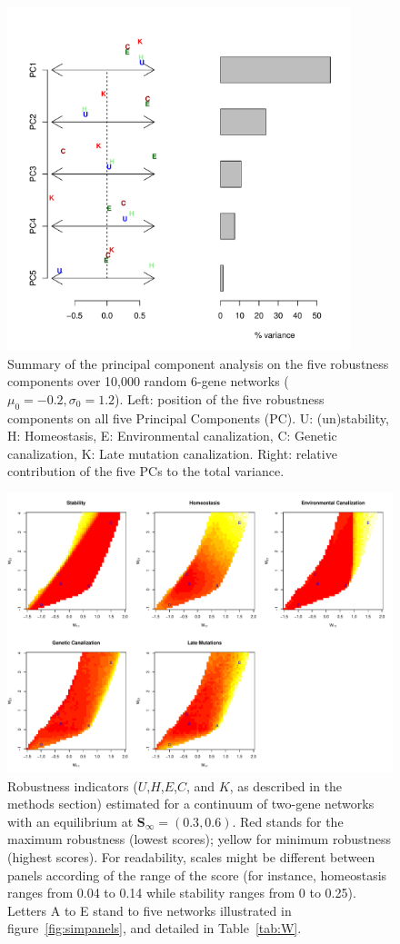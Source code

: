 \documentclass{article}
\begin{document}
\clearpage
\begin{figure}[h!]
\includegraphics[width=10cm]{figures/R1-1-6}
\caption{\label{fig:pca} Summary of the principal component analysis on the five robustness components over 10,000 random 6-gene networks ($\mu_0=-0.2, \sigma_0=1.2$). Left: position of the five robustness components on all five Principal Components (PC). U: (un)stability, H: Homeostasis, E: Environmental canalization, C: Genetic canalization, K: Late mutation canalization. Right: relative contribution of the five PCs to the total variance.}
\end{figure}

\clearpage
\begin{figure}[h!]
\includegraphics[width=15cm]{figures/T2-2-1}
\caption{\label{fig:imgpanels} Robustness indicators ($U$,$H$,$E$,$C$, and $K$, as described in the methods section) estimated for a continuum of two-gene networks with an equilibrium at $\bm S_\infty = (0.3, 0.6)$. Red stands for the maximum robustness (lowest scores); yellow for minimum robustness (highest scores). For readability, scales might be different between panels according of the range of the score (for instance, homeostasis ranges from 0.04 to 0.14 while stability ranges from 0 to 0.25). Letters A to E stand to five networks illustrated in figure~\ref{fig:simpanels}, and detailed in Table~\ref{tab:W}.}
\end{figure}
\end{document}
